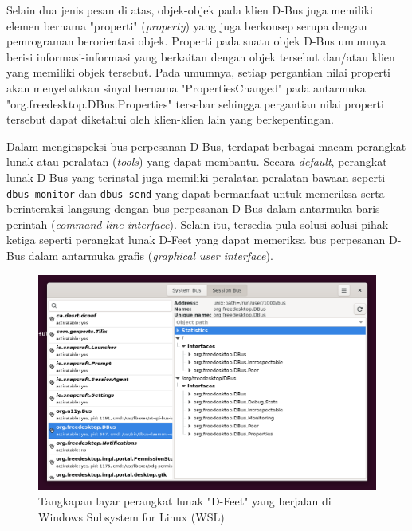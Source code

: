 Selain dua jenis pesan di atas, objek-objek pada klien D-Bus juga memiliki elemen bernama "properti" (\textit{property}) yang juga berkonsep serupa dengan pemrograman berorientasi objek. Properti pada suatu objek D-Bus umumnya berisi informasi-informasi yang berkaitan dengan objek tersebut dan/atau klien yang memiliki objek tersebut. Pada umumnya, setiap pergantian nilai properti akan menyebabkan sinyal bernama "PropertiesChanged" pada antarmuka "org.freedesktop.DBus.Properties" tersebar sehingga pergantian nilai properti tersebut dapat diketahui oleh klien-klien lain yang berkepentingan.

Dalam menginspeksi bus perpesanan D-Bus, terdapat berbagai macam perangkat lunak atau peralatan (\textit{tools}) yang dapat membantu. Secara \textit{default}, perangkat lunak D-Bus yang terinstal juga memiliki peralatan-peralatan bawaan seperti \verb|dbus-monitor| dan \verb|dbus-send| yang dapat bermanfaat untuk memeriksa serta berinteraksi langsung dengan bus perpesanan D-Bus dalam antarmuka baris perintah (\textit{command-line interface}). Selain itu, tersedia pula solusi-solusi pihak ketiga seperti perangkat lunak D-Feet yang dapat memeriksa bus perpesanan D-Bus dalam antarmuka grafis (\textit{graphical user interface}).

\begin{figure}[h]
    \centering
    \includegraphics[width=0.75\linewidth]{assets/dfeet-window-screenshot.png}
    \caption{Tangkapan layar perangkat lunak "D-Feet" yang berjalan di Windows Subsystem for Linux (WSL)}
    \label{fig:enter-label}
\end{figure}



